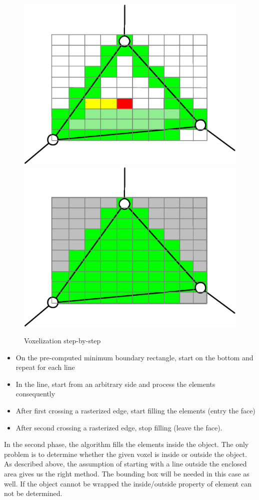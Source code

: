 \begin{figure}
\includegraphics[scale=0.25]{../img/voxelize_3.eps}
\includegraphics[scale=0.25]{../img/voxelize_4.eps}

\caption{Voxelization step-by-step}
\label{fig:voxelize}

\end{figure}

\begin{itemize}
\item On the pre-computed minimum boundary rectangle, start on the bottom and repeat for each line
\item In the line, start from an arbitrary side and process the elements consequently
\item After first crossing a rasterized edge, start filling the elements (entry the face)
\item After second crossing a rasterized edge, stop filling (leave the face).

\end{itemize}

In the second phase, the algorithm fills the elements inside the object. The only problem is to
determine whether the given voxel is inside or outside the object. As described above, the assumption of
starting with a line outside the enclosed area gives us the right method. The
bounding box will be needed in this case as well. If the object cannot be wrapped
the inside/outside property of element can not be determined.
